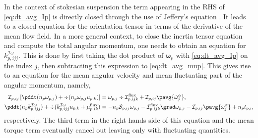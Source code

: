 In the context of stokesian suspension the term appearing in the RHS of \ref{eq:dt_avg_Ip} is directly closed through the use of Jeffery's equation \citet{guazzelli2011}.
It leads to a closed equation for the orientation tensor in terms of the derivative of the mean flow field. 
In a more general context, to close the inertia tensor equation and compute the total angular momentum, one needs to obtain an equation for $k^{\mathcal{I}\omega}_{p,ijj}$. 
This is done by first taking the dot product of $\bm{\omega}_{p}$ with \ref{eq:dt_avg_Ip} on the index $j$, then subtracting this expression to \ref{eq:dt_avg_mup}.
This gives rise to an equation for the mean angular velocity and mean fluctuating part of the angular momentum, namely, 
\begin{align}
    \label{eq:dt_avg_kIp}
    \mathcal{I}_{p,ij}\left[
        \pddt (n_p\omega_{p,j})
        + \div (n_p\omega_{p,j} u_{p,k})
    \right]
    &= 
    \omega_{p,j}\div\mathcal{I}_{p,ijk}^\text{flux} 
    + \mathcal{I}_{p,ij}\pavg{\dot{\omega}^\alpha_j},
    \\
    \pddt (n_p k^{\mathcal{I}\omega}_{p,ijj})
    + \div (k^{\mathcal{I}\omega}_{p,ijj} u_{p,k}
    + \mu_{p,ik}^\text{flux}
    )
    &= 
    - n_p \mathcal{S}_{p,ij}\omega_{p,j}
    - \mathcal{I}_{p,ijk}^\text{flux}\grad \omega_{p,j}
    - \mathcal{I}_{p,ij}\pavg{\dot{\omega}^\alpha_j}
    + n_p t_{p,i},
\end{align}
respectively. 
The third term in the right hands side of this equation and the mean torque term eventually cancel out leaving only with fluctuating quantities. 

